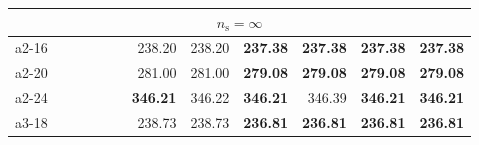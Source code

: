 \documentclass[aspectratio=1610]{beamer}
\begin{document}
\begin{frame}
\begin{table}[]
{\begin{tabular}{lrrrrrrrrrrr}
\multicolumn{12}{c}{$n_\mathrm{s} = \infty$}                                                                                                                                                                                                                                                                                                                                                                                                                                                                                                                    \\ \hline
a2-16                                          &                                                         & \multicolumn{1}{r|}{}                &                                                              & \textbf{}       & \multicolumn{1}{r|}{}                                       & 238.20              & \multicolumn{1}{r|}{238.20}                                    & \textbf{237.38}   & \multicolumn{1}{r|}{{\color[HTML]{FE0000} \textbf{237.38}}}  & \textbf{237.38}               & {\color[HTML]{FE0000} \textbf{237.38}}               \\
a2-20                                          &                                                         & \multicolumn{1}{r|}{}                &                                                              &                 & \multicolumn{1}{r|}{}                                       & 281.00              & \multicolumn{1}{r|}{281.00}                                    & \textbf{279.08}   & \multicolumn{1}{r|}{{\color[HTML]{FE0000} \textbf{279.08}}}  & \textbf{279.08}               & {\color[HTML]{FE0000} \textbf{279.08}}               \\
a2-24                                          &                                                         & \multicolumn{1}{r|}{}                &                                                              &                 & \multicolumn{1}{r|}{}                                       & \textbf{346.21}     & \multicolumn{1}{r|}{346.22}                                    & \textbf{346.21}   & \multicolumn{1}{r|}{346.39}                                  & \textbf{346.21}               & {\color[HTML]{FE0000} \textbf{346.21}}               \\
a3-18                                          &                                                         & \multicolumn{1}{r|}{}                &                                                              & \textbf{}       & \multicolumn{1}{r|}{}                                       & 238.73              & \multicolumn{1}{r|}{238.73}                                    & \textbf{236.81}   & \multicolumn{1}{r|}{{\color[HTML]{FE0000} \textbf{236.81}}}  & \textbf{236.81}               & {\color[HTML]{FE0000} \textbf{236.81}}               \\

\end{tabular}}
\end{table}
\end{frame}
\end{document}
